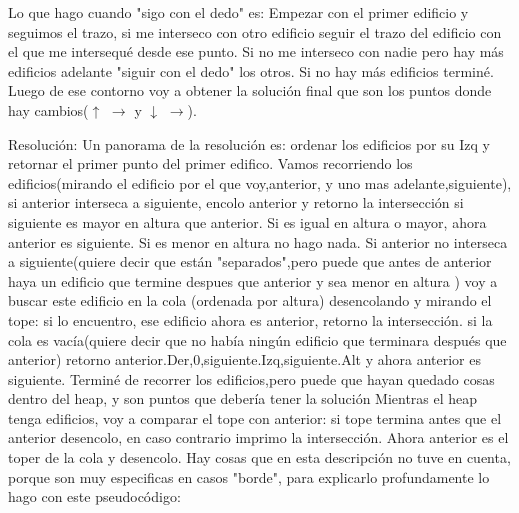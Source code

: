 \documentclass{article}
\begin{document}
Lo que hago cuando "sigo con el dedo" es: \newline
Empezar con el primer edificio y seguimos el trazo, si me interseco con otro edificio seguir el trazo del edificio con el que me intersequ\'e desde ese punto. \newline
Si no me interseco con nadie pero hay m\'as edificios adelante "siguir con el dedo" los otros. Si no hay más edificios termin\'e.\newline
Luego de ese contorno voy a obtener la soluci\'on final que son los puntos donde hay cambios($\uparrow$ $\longrightarrow$ y $\downarrow$ $\longrightarrow$). \newline

\newpage

{\noindent \Huge Resoluci\'on:}
\newline \newline
Un panorama de la resolución es:\newline
ordenar los edificios por su Izq y retornar el primer punto del primer edifico. Vamos recorriendo los edificios(mirando el edificio por el que voy,anterior, y uno mas adelante,siguiente), si anterior interseca a siguiente, encolo anterior y retorno la intersección si siguiente es mayor en altura que anterior.\newline
Si es igual en altura o mayor, ahora anterior es siguiente. Si es menor en altura no hago nada. \color{red}{no vale la pena ponerlo} \newline \color{black}{}
Si anterior no interseca a siguiente(quiere decir que están "separados",pero puede que antes de anterior haya un edificio que termine despues que anterior y sea menor en altura )
voy a buscar este edificio en la cola (ordenada por altura) desencolando y mirando el tope:\newline
si lo encuentro, ese edificio ahora es anterior, retorno la intersección.\newline
si la cola es vacía(quiere decir que no había ningún edificio que terminara después que anterior) retorno anterior.Der,0,siguiente.Izq,siguiente.Alt y ahora anterior es siguiente.
\newline
Terminé de recorrer los edificios,pero puede que hayan quedado cosas dentro del heap, y son puntos que debería tener la solución
Mientras el heap tenga edificios, voy a comparar el tope con anterior:\newline
si tope termina antes que el anterior desencolo, en caso contrario imprimo la intersección. 
Ahora anterior es el toper de la cola y desencolo.
\newline
Hay cosas que en esta descripción no tuve en cuenta, porque son muy especificas en casos "borde", para explicarlo profundamente lo hago con este pseudocódigo: 
\newline
 
\end{document}
